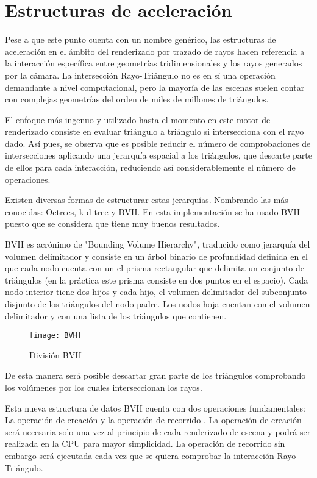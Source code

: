 \section{Estructuras de aceleración}
\label{BVH}
	
Pese a que este punto cuenta con un nombre genérico, las estructuras de aceleración en el ámbito del renderizado por trazado de rayos hacen referencia a la interacción específica entre geometrías tridimensionales y los rayos generados por la cámara. La intersección Rayo-Triángulo no es en sí una operación demandante a nivel computacional, pero la mayoría de las escenas suelen contar con complejas geometrías del orden de miles de millones de triángulos.

El enfoque más ingenuo y utilizado hasta el momento en este motor de renderizado consiste en evaluar triángulo a triángulo si intersecciona con el rayo dado. Así pues, se observa que es posible reducir el número de comprobaciones de intersecciones aplicando una jerarquía espacial a los triángulos, que descarte parte de ellos para cada interacción, reduciendo así considerablemente el número de operaciones.

Existen diversas formas de estructurar estas jerarquías. Nombrando las más conocidas: Octrees, k-d tree y BVH. En esta implementación se ha usado BVH puesto que se considera que tiene muy buenos resultados.

BVH es acrónimo de "Bounding Volume Hierarchy", traducido como jerarquía del volumen delimitador y consiste en un árbol binario de profundidad definida en el que cada nodo cuenta con un el prisma rectangular que delimita un conjunto de triángulos (en la práctica este prisma consiste en dos puntos en el espacio). Cada nodo interior tiene dos hijos y cada hijo, el volumen delimitador del subconjunto disjunto de los triángulos del nodo padre. Los nodos hoja cuentan con el volumen delimitador y con una lista de los triángulos que contienen.

\begin{figure}
    \centering
	\texttt{[image: BVH]}
	\caption{División BVH}
	\label{fig:label}
\end{figure}

De esta manera será posible descartar gran parte de los triángulos comprobando los volúmenes por los cuales interseccionan los rayos.

Esta nueva estructura de datos BVH cuenta con dos operaciones fundamentales: La operación de creación  y la operación de recorrido . La operación de creación será necesaria solo una vez al principio de cada renderizado de escena y podrá ser realizada en la CPU para mayor simplicidad. La operación de recorrido sin embargo será ejecutada cada vez que se quiera comprobar la interacción Rayo-Triángulo.

